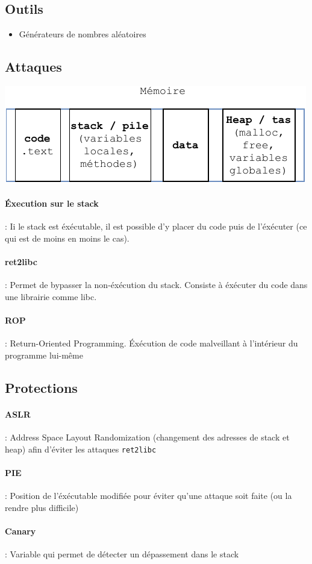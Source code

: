 \documentclass[resume]{subfiles}
\begin{document}
\subsection{Outils}
\begin{itemize}
\item Générateurs de nombres aléatoires
\end{itemize}
\subsection{Attaques}
\begin{center}
\includegraphics[scale=1,page=1]{Schemas-crop.pdf}
\end{center}
\paragraph{Éxecution sur le stack} : Ii le stack est éxécutable, il est possible d'y placer du code puis de l'éxécuter (ce qui est de moins en moins le cas).
\paragraph{ret2libc} : Permet de bypasser la non-éxécution du stack. Consiste à éxécuter du code dans une librairie comme libc.
\paragraph{ROP} : Return-Oriented Programming. Éxécution de code malveillant à l'intérieur du programme lui-même
\subsection{Protections}
\label{sec_protections}
\paragraph{ASLR} : Address Space Layout Randomization (changement des adresses de stack et heap) afin d'éviter les attaques \verb!ret2libc!
\paragraph{PIE} : Position de l'éxécutable modifiée pour éviter qu'une attaque soit faite (ou la rendre plus difficile)
\paragraph{Canary} : Variable qui permet de détecter un dépassement dans le stack
\end{document}
